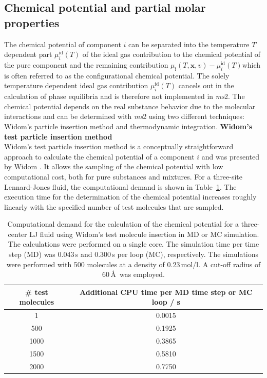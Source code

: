 \subsection{Chemical potential and partial molar properties }
\label{sec:Chemical potential and partial molar properties }

The chemical potential of component $i$ can be separated into the temperature $T$ dependent part ${\mu}^{\mathrm{id}}_{i}(T)$ of the ideal gas contribution to the chemical potential of the pure component and the remaining contribution ${\mu}_{\mathrm{i}}(T,\textbf{x},v)-{\mu}^{\mathrm{id}}_{i}(T)$which is often referred to as the configurational chemical potential. The solely temperature dependent ideal gas contribution ${\mu}^{\mathrm{id}}_{i}(T)$ cancels out in the calculation of phase equilibria and is therefore not implemented in \textit{ms}2. The chemical potential depends on the real substance behavior due to the molecular interactions and can be determined with \textit{ms}2 using two different techniques: Widom's particle insertion method and thermodynamic integration. 
\newline \newline 
\textbf{Widom's test particle insertion method}\\
Widom's test particle insertion method is a conceptually straightforward approach to calculate the chemical potential of a component $i$ and was presented by Widom \cite{widom}. It allows the sampling of the chemical potential with low computational cost, both for pure substances and mixtures. For a three-site Lennard-Jones fluid, the computational demand is shown in Table~\ref{tab:ComputationalDemand}. The execution time for the determination of the chemical potential increases roughly linearly with the specified number of test molecules that are sampled.
\begin{table}[h!]
	\centering
	\caption{Computational demand for the calculation of the chemical potential for a three-center LJ fluid using   Widom's test molecule insertion in MD or MC simulation. The calculations were performed on a single core. The simulation time per time step (MD) was 0.043\,s and 0.300\,s per loop (MC), respectively. The simulations were performed with 500 molecules at a density of 0.23\,mol/l. A cut-off radius of 60\,\AA~was employed.}
	\begin{tabular} {c|c} 
		\hline \hline
		\# test molecules & Additional CPU time per MD time step or MC loop / s \\
		\hline
		1 & 0.0015 \\
		500 & 0.1925 \\
		1000 & 0.3865\\
		1500 & 0.5810\\
		2000 & 0.7750\\                          
		\hline \hline
	\end{tabular}   
	\label{tab:ComputationalDemand}
\end{table}

